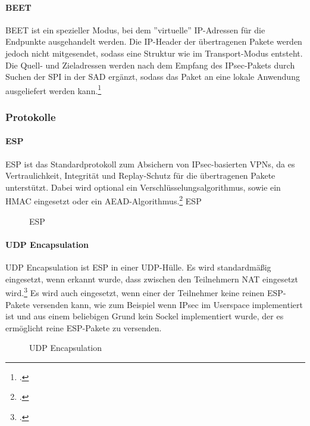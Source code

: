 \paragraph{BEET}
\ac{BEET} ist ein spezieller Modus, bei dem ''virtuelle'' \ac{IP}-Adressen für die Endpunkte
ausgehandelt werden. Die \ac{IP}-Header der übertragenen Pakete werden jedoch nicht mitgesendet,
sodass eine Struktur wie im Transport-Modus entsteht. Die Quell- und Zieladressen
werden nach dem Empfang des \ac{IPsec}-Pakets durch Suchen der \ac{SPI} in der \ac{SAD}
ergänzt, sodass das Paket an eine lokale Anwendung ausgeliefert werden kann.\footcite[Appendix B][]{petri_jokela_rfc_2015}

\subsubsection{Protokolle}

\paragraph{ESP}
\ac{ESP} ist das Standardprotokoll zum Absichern von \ac{IPsec}-basierten \acp{VPN},
da es Vertraulichkeit, Integrität und Replay-Schutz für die übertragenen Pakete unterstützt.
Dabei wird optional ein Verschlüsselungsalgorithmus, sowie ein \ac{HMAC} eingesetzt oder
ein \ac{AEAD}-Algorithmus.\footcite[][]{stephen_kent_rfc_2005-2}
\ac{ESP} 
\begin{figure}
    \label{fig:ESP}
    \centering
    \def\svgwidth{\columnwidth}
    
    \caption{\ac{ESP}}
\end{figure}

\paragraph{UDP Encapsulation}
UDP Encapsulation ist \ac{ESP} in einer UDP-Hülle. Es wird standardmäßig eingesetzt, wenn
erkannt wurde, dass zwischen den Teilnehmern \ac{NAT} eingesetzt wird.\footcite[][]{markus_stenberg_rfc_2005}
Es wird auch eingesetzt, wenn einer der Teilnehmer keine reinen \ac{ESP}-Pakete versenden kann,
wie zum Beispiel wenn \ac{IPsec} im Userspace implementiert ist und aus einem beliebigen Grund
kein Sockel implementiert wurde, der es ermöglicht reine \ac{ESP}-Pakete zu versenden.
\begin{figure}
    \label{fig:UDP-Encapsulation}
    \centering
    \def\svgwidth{\columnwidth}
    
    \caption{UDP Encapsulation}
\end{figure}

